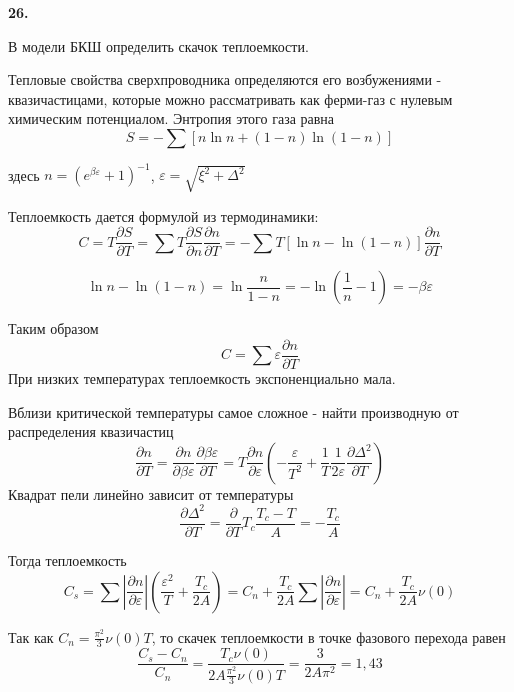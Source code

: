 \documentclass[a4paper,12pt]{article} %
\begin{document}
\begin{ttask} \textbf{26.} 

В модели БКШ определить скачок теплоемкости.



Тепловые свойства сверхпроводника определяются его возбужениями - квазичастицами, 
которые можно рассматривать как ферми-газ с нулевым химическим потенциалом. 
Энтропия этого газа равна
$$
S=-\sum[n \ln n+(1-n) \ln (1-n)]
$$

здесь 
$n=\left(e^{\beta \varepsilon}+1\right)^{-1}$,  
$\varepsilon=\sqrt{\xi^{2}+\Delta^{2}} $


Теплоемкость дается формулой из термодинамики:
$$
C=T \frac{\partial S}{\partial T}=\sum T \frac{\partial S}{\partial n} \frac{\partial n}{\partial T}=-\sum T[\ln n-\ln (1-n)] \frac{\partial n}{\partial T}
$$

$$
\ln n-\ln (1-n)=\ln \frac{n}{1-n}=-\ln \left(\frac{1}{n}-1\right)=-\beta \varepsilon
$$


Таким образом
$$
C=\sum \varepsilon \frac{\partial n}{\partial T}
$$
При низких температурах теплоемкость экспоненциально мала. 

Вблизи критической температуры самое сложное - 
найти производную от распределения квазичастиц
$$
\frac{\partial n}{\partial T}
=
\frac{\partial n}{\partial \beta \varepsilon} 
\frac{\partial \beta \varepsilon}{\partial T}
=
T \frac{\partial n}{\partial \varepsilon}
\left(-\frac{\varepsilon}{T^{2}}
+
\frac{1}{T} \frac{1}{2 \varepsilon} 
\frac{\partial \Delta^{2}}{\partial T}
\right)
$$
Квадрат пели линейно зависит от температуры
$$
\frac{\partial \Delta^{2}}{\partial T}=\frac{\partial}{\partial T} T_{c} \frac{T_{c}-T}{A}=-\frac{T_{c}}{A}
$$

Тогда теплоемкость
$$
C_{s}
=
\sum\left|\frac{\partial n}{\partial \varepsilon}\right|\left(\frac{\varepsilon^{2}}{T}+\frac{T_{c}}{2 A}\right)
=
C_{n}+\frac{T_{c}}{2 A} \sum\left|\frac{\partial n}{\partial \varepsilon}\right|
=
C_{n}+\frac{T_{c}}{2 A} \nu(0)
$$


Так как $C_{n}=\frac{\pi^{2}}{3} \nu(0) T$, 
то скачек теплоемкости в точке фазового перехода равен
$$
\frac{C_{s}-C_{n}}{C_{n}}=\frac{T_{c} \nu(0)}{2 A \frac{\pi^{2}}{3} \nu(0) T}=\frac{3}{2 A \pi^{2}}=1,43
$$














\end{ttask}
\end{document}
